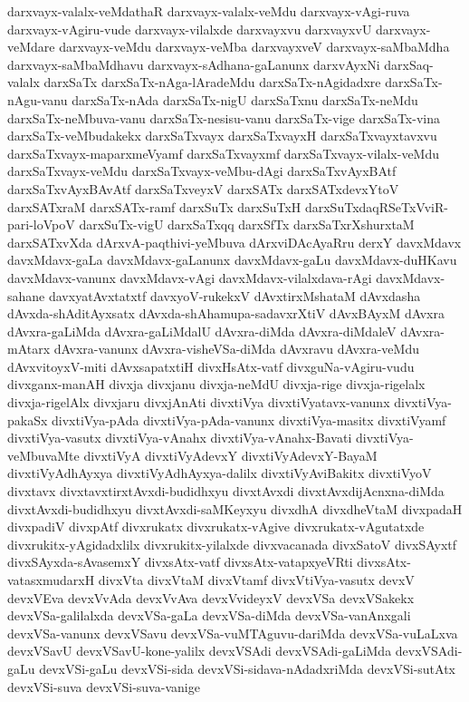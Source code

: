 {darxvayx-valalx-veMdathaR
darxvayx-valalx-veMdu
darxvayx-vAgi-ruva
darxvayx-vAgiru-vude
darxvayx-vilalxde
darxvayxvu
darxvayxvU
darxvayx-veMdare
darxvayx-veMdu
darxvayx-veMba
darxvayxveV
darxvayx-saMbaMdha
darxvayx-saMbaMdhavu
darxvayx-sAdhana-gaLanunx
darxvAyxNi
darxSaq-valalx
darxSaTx
darxSaTx-nAga-lAradeMdu
darxSaTx-nAgidadxre
darxSaTx-nAgu-vanu
darxSaTx-nAda
darxSaTx-nigU
darxSaTxnu
darxSaTx-neMdu
darxSaTx-neMbuva-vanu
darxSaTx-nesisu-vanu
darxSaTx-vige
darxSaTx-vina
darxSaTx-veMbudakekx
darxSaTxvayx
darxSaTxvayxH
darxSaTxvayxtavxvu
darxSaTxvayx-maparxmeVyamf
darxSaTxvayxmf
darxSaTxvayx-vilalx-veMdu
darxSaTxvayx-veMdu
darxSaTxvayx-veMbu-dAgi
darxSaTxvAyxBAtf
darxSaTxvAyxBAvAtf
darxSaTxveyxV
darxSATx
darxSATxdevxYtoV
darxSATxraM
darxSATx-ramf
darxSuTx
darxSuTxH
darxSuTxdaqRSeTxVviR-pari-loVpoV
darxSuTx-vigU
darxSaTxqq
darxSfTx
darxSaTxrXshurxtaM
darxSATxvXda
dArxvA-paqthivi-yeMbuva
dArxviDAcAyaRru
derxY
davxMdavx
davxMdavx-gaLa
davxMdavx-gaLanunx
davxMdavx-gaLu
davxMdavx-duHKavu
davxMdavx-vanunx
davxMdavx-vAgi
davxMdavx-vilalxdava-rAgi
davxMdavx-sahane
davxyatAvxtatxtf
davxyoV-rukekxV
dAvxtirxMshataM
dAvxdasha
dAvxda-shAditAyxsatx
dAvxda-shAhamupa-sadavxrXtiV
dAvxBAyxM
dAvxra
dAvxra-gaLiMda
dAvxra-gaLiMdalU
dAvxra-diMda
dAvxra-diMdaleV
dAvxra-mAtarx
dAvxra-vanunx
dAvxra-visheVSa-diMda
dAvxravu
dAvxra-veMdu
dAvxvitoyxV-miti
dAvxsapatxtiH
divxHsAtx-vatf
divxguNa-vAgiru-vudu
divxganx-manAH
divxja
divxjanu
divxja-neMdU
divxja-rige
divxja-rigelalx
divxja-rigelAlx
divxjaru
divxjAnAti
divxtiVya
divxtiVyatavx-vanunx
divxtiVya-pakaSx
divxtiVya-pAda
divxtiVya-pAda-vanunx
divxtiVya-masitx
divxtiVyamf
divxtiVya-vasutx
divxtiVya-vAnahx
divxtiVya-vAnahx-Bavati
divxtiVya-veMbuvaMte
divxtiVyA
divxtiVyAdevxY
divxtiVyAdevxY-BayaM
divxtiVyAdhAyxya
divxtiVyAdhAyxya-dalilx
divxtiVyAviBakitx
divxtiVyoV
divxtavx
divxtavxtirxtAvxdi-budidhxyu
divxtAvxdi
divxtAvxdijAcnxna-diMda
divxtAvxdi-budidhxyu
divxtAvxdi-saMKeyxyu
divxdhA
divxdheVtaM
divxpadaH
divxpadiV
divxpAtf
divxrukatx
divxrukatx-vAgive
divxrukatx-vAgutatxde
divxrukitx-yAgidadxlilx
divxrukitx-yilalxde
divxvacanada
divxSatoV
divxSAyxtf
divxSAyxda-sAvasemxY
divxsAtx-vatf
divxsAtx-vatapxyeVRti
divxsAtx-vatasxmudarxH
divxVta
divxVtaM
divxVtamf
divxVtiVya-vasutx
devxV
devxVEva
devxVvAda
devxVvAva
devxVvideyxV
devxVSa
devxVSakekx
devxVSa-galilalxda
devxVSa-gaLa
devxVSa-diMda
devxVSa-vanAnxgali
devxVSa-vanunx
devxVSavu
devxVSa-vuMTAguvu-dariMda
devxVSa-vuLaLxva
devxVSavU
devxVSavU-kone-yalilx
devxVSAdi
devxVSAdi-gaLiMda
devxVSAdi-gaLu
devxVSi-gaLu
devxVSi-sida
devxVSi-sidava-nAdadxriMda
devxVSi-sutAtx
devxVSi-suva
devxVSi-suva-vanige
}
